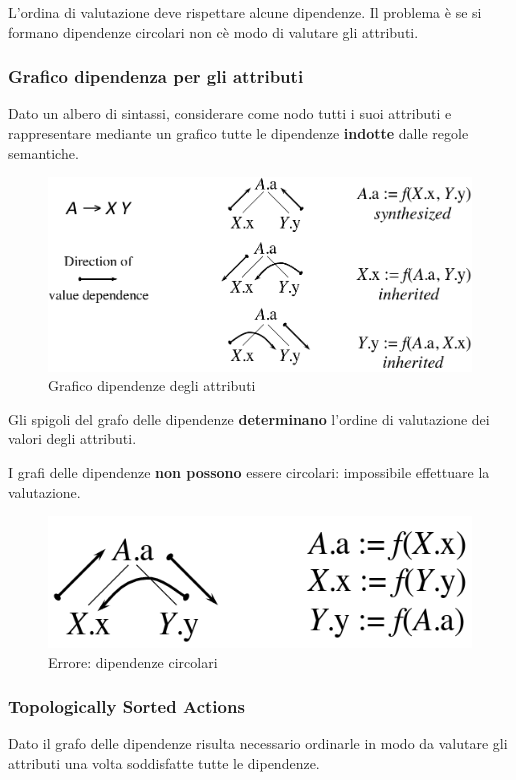L'ordina di valutazione deve rispettare alcune dipendenze. Il problema \`e se si
formano dipendenze circolari non c\`e modo di valutare gli attributi.

\subsubsection{Grafico dipendenza per gli attributi}
Dato un albero di sintassi, considerare come nodo tutti i suoi attributi e
rappresentare mediante un grafico tutte le dipendenze \textbf{indotte} dalle
regole semantiche.

\begin{figure}[H]
  \centering
  \includegraphics[scale=0.4]{res/image/dependencies_graph}
  \caption{Grafico dipendenze degli attributi}
  \label{img:dependencies_graph}
\end{figure}

Gli spigoli del grafo delle dipendenze \textbf{determinano} l'ordine di
valutazione dei valori degli attributi.

I grafi delle dipendenze \textbf{non possono} essere circolari: impossibile
effettuare la valutazione.
\begin{figure}[H]
  \centering
  \includegraphics[scale=0.4]{res/image/circular_dependencies}
  \caption{Errore: dipendenze circolari}
  \label{img:circular_dependencies}
\end{figure}

\subsubsection{Topologically Sorted Actions}
\label{sec:evaluation_order}
Dato il grafo delle dipendenze risulta necessario ordinarle in modo da valutare
gli attributi una volta soddisfatte tutte le dipendenze.

